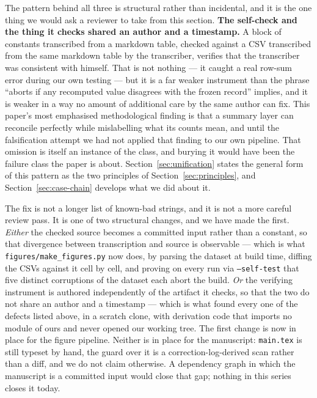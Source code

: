 \documentclass[sigconf,review]{acmart}
\begin{document}
The pattern behind all three is structural rather than incidental, and it is
the one thing we would ask a reviewer to take from this section.
\textbf{The self-check and the thing it checks shared an author and a
timestamp.} A block of constants transcribed from a markdown table, checked
against a CSV transcribed from the same markdown table by the transcriber,
verifies that the transcriber was consistent with himself. That is not
nothing --- it caught a real row-sum error during our own testing --- but it
is a far weaker instrument than the phrase ``aborts if any recomputed value
disagrees with the frozen record'' implies, and it is weaker in a way no
amount of additional care by the same author can fix. This paper's most
emphasised methodological finding is that a summary layer can reconcile
perfectly while mislabelling what its counts mean, and until the falsification
attempt we had not applied that finding to our own pipeline. That omission is
itself an instance of the class, and burying it would have been the failure
class the paper is about. Section~\ref{sec:unification} states the general form
of this pattern as the two principles of Section~\ref{sec:principles}, and
Section~\ref{sec:case-chain} develops what we did about it.

The fix is not a longer list of known-bad strings, and it is not a more
careful review pass. It is one of two structural changes, and we have made
the first. \emph{Either} the checked source becomes a committed input rather
than a constant, so that divergence between transcription and source is
observable --- which is what \texttt{figures/make\_figures.py} now does, by
parsing the dataset at build time, diffing the CSVs against it cell by cell,
and proving on every run via \texttt{--self-test} that five distinct
corruptions of the dataset each abort the build. \emph{Or} the verifying
instrument is authored independently of the artifact it checks, so that the
two do not share an author and a timestamp --- which is what found every one of
the defects listed above, in a scratch clone, with derivation code that imports
no module of ours and never opened our working tree. The first change is now in
place for the figure pipeline. Neither is in place for the manuscript:
\texttt{main.tex} is still typeset by hand, the guard over it is a
correction-log-derived scan rather than a diff, and we do not claim otherwise.
A dependency graph in which the manuscript is a committed input would close
that gap; nothing in this series closes it today.
\end{document}
